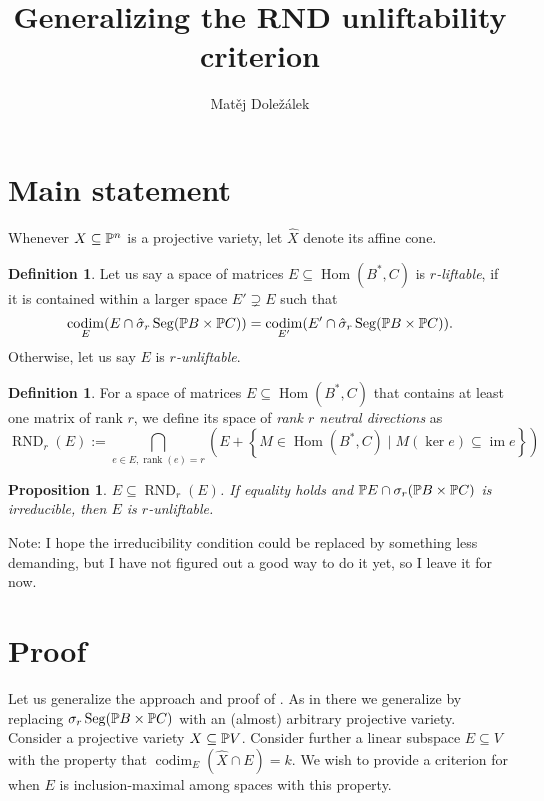 \documentclass[a4paper,10pt]{article}
\title{Generalizing the RND unliftability criterion}
\author{Matěj Doležálek}
\date{}
\def\zav#1{\left(#1\right)}
\def\set#1{\left\{#1\right\}}
\DeclareMathOperator{\Hom}{Hom}\let\hom\Hom
\DeclareMathOperator{\rank}{rank}\let\rk\rank
\DeclareMathOperator{\im}{im}
\DeclareMathOperator{\codim}{codim}
\DeclareMathOperator{\RND}{RND}
\DeclareMathOperator{\Seg}{Seg}
\newtheorem{prop}[theorem]{Proposition}
\theoremstyle{definition}
\newtheorem{definition}[theorem]{Definition}
\theoremstyle{remark}
\begin{document}
\maketitle

\section{Main statement}

Whenever $X\subseteq\pe^n$ is a projective variety, let $\hat X$ denote its affine cone.
\begin{definition}
    Let us say a space of matrices $E\subseteq \Hom(B^*,C)$ is \emph{$r$-liftable}, if it is contained within a larger space $E'\supsetneq E$ such that
    \[
        \codim_E(E\cap \hat\sigma_r\Seg(\pe B\times\pe C)) = \codim_{E'}({E'}\cap \hat\sigma_r\Seg(\pe B\times\pe C)).
    \]
    Otherwise, let us say $E$ is \emph{$r$-unliftable}.
\end{definition}

\begin{definition}
    For a space of matrices $E\subseteq \Hom(B^*,C)$ that contains at least one matrix of rank $r$, we define its space of \emph{rank $r$ neutral directions} as
    \[
        \RND_r(E) := \bigcap_{e\in E, \rank(e)=r} \zav{E + \set{M\in \Hom(B^*,C)\mid M(\ker e)\subseteq \im e}}
    \]
\end{definition}

\begin{prop}
    \label{prp:main}
    $E\subseteq\RND_r(E)$. If equality holds and $\pe E\cap \sigma_r(\pe B\times\pe C)$ is irreducible, then $E$ is $r$-unliftable.
\end{prop}
Note: I hope the irreducibility condition could be replaced by something less demanding, but I have not figured out a good way to do it yet, so I leave it for now.


\section{Proof}

Let us generalize the approach and proof of \cite[Section 3]{draisma}. As in there we generalize by replacing $\sigma_r \Seg(\pe B\times\pe C)$ with an (almost) arbitrary projective variety. Consider a projective variety $X\subseteq \pe V$. Consider further a linear subspace $E\subseteq V$ with the property that $\codim_E(\hat X \cap E) = k$. We wish to provide a criterion for when $E$ is inclusion-maximal among spaces with this property.
\end{document}

